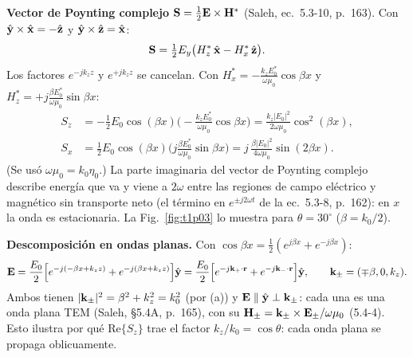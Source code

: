  \textbf{Vector de Poynting complejo} $\mathbf S=\frac12\mathbf E\times\mathbf H^*$ (Saleh, ec.~5.3-10, p.~163). Con
$\hat{\mathbf y}\times\hat{\mathbf x}=-\hat{\mathbf z}$ y $\hat{\mathbf y}\times\hat{\mathbf z}=\hat{\mathbf x}$:
\begin{equation*}
\mathbf S=\tfrac12E_y\big(H_z^*\,\hat{\mathbf x}-H_x^*\,\hat{\mathbf z}\big).
\end{equation*}
Los factores $e^{-jk_zz}$ y $e^{+jk_zz}$ se cancelan. Con
$H_x^*=-\frac{k_zE_0^*}{\omega\mu_0}\cos\beta x$ y $H_z^*=+j\frac{\beta E_0^*}{\omega\mu_0}\sin\beta x$:
\begin{align*}
S_z&=-\tfrac12E_0\cos(\beta x)\Big(-\frac{k_zE_0^*}{\omega\mu_0}\cos\beta x\Big)=\frac{k_z|E_0|^2}{2\omega\mu_0}\cos^2(\beta x),\\
S_x&=\tfrac12E_0\cos(\beta x)\Big(j\frac{\beta E_0^*}{\omega\mu_0}\sin\beta x\Big)=j\,\frac{\beta|E_0|^2}{4\omega\mu_0}\sin(2\beta x).
\end{align*}
(Se usó $\omega\mu_0=k_0\eta_0$.) La parte imaginaria del vector de Poynting complejo describe energía
que va y viene a $2\omega$ entre las regiones de campo eléctrico y magnético sin transporte neto
(el término en $e^{\pm j2\omega t}$ de la ec.~5.3-8, p.~162): en $x$ la onda es estacionaria. La
Fig.~\ref{fig:t1p03} lo muestra para $\theta=30^\circ$ ($\beta=k_0/2$).

 \textbf{Descomposición en ondas planas.} Con $\cos\beta x=\frac12(e^{j\beta x}+e^{-j\beta x})$:
\begin{equation*}
\mathbf E=\frac{E_0}{2}\Big[e^{-j(-\beta x+k_zz)}+e^{-j(\beta x+k_zz)}\Big]\hat{\mathbf y}
=\frac{E_0}{2}\Big[e^{-j\mathbf k_+\cdot\mathbf r}+e^{-j\mathbf k_-\cdot\mathbf r}\Big]\hat{\mathbf y},\qquad \mathbf k_\pm=(\mp\beta,0,k_z).
\end{equation*}
Ambos tienen $|\mathbf k_\pm|^2=\beta^2+k_z^2=k_0^2$ (por (a)) y $\mathbf E\parallel\hat{\mathbf y}\perp\mathbf k_\pm$: cada una es una
onda plana TEM (Saleh, §5.4A, p.~165), con su $\mathbf H_\pm=\mathbf k_\pm\times\mathbf E_\pm/\omega\mu_0$ (5.4-4).
Esto ilustra por qué $\mathrm{Re}\{S_z\}$ trae el factor $k_z/k_0=\cos\theta$: cada onda plana se
propaga oblicuamente.

